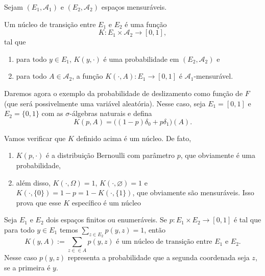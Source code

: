Sejam $(E_1, \mathcal{A}_1)$ e $(E_2, \mathcal{A}_2)$ espaços mensuráveis.
\begin{definition}
  Um núcleo de transição entre $E_1$ e $E_2$ é uma função 
  \begin{equation}
    K: E_1 \times \mathcal{A}_2 \to [0,1],
  \end{equation}
  tal que
  \begin{enumerate}[\quad a)]
  \item para todo $y \in E_1$, $K(y,\cdot)$ é uma probabilidade em $(E_2, \mathcal{A}_2)$ e
  \item para todo $A \in \mathcal{A}_2$, a função $K(\cdot, A): E_1 \to [0,1]$ é $\mathcal{A}_1$-mensurável.
  \end{enumerate}
\end{definition}

\begin{example}
  \label{x:chance_deslizamento}
  Daremos agora o exemplo da probabilidade de deslizamento como função de $F$ (que será possivelmente uma variável aleatória).
  Nesse caso, seja $E_1 = [0,1]$ e $E_2 = \{0,1\}$ com as $\sigma$-álgebras naturais e defina
  \begin{equation}
    K(p, A) = \big( (1-p)\delta_0 + p \delta_1 \big) (A).
  \end{equation}
\end{example}

Vamos verificar que $K$ definido acima é um núcleo.
De fato,
\begin{enumerate}[\quad i)]
\item $K(p, \cdot)$ é a distribuição Bernoulli com parâmetro $p$, que obviamente é uma probabilidade,
\item além disso, $K(\cdot, \Omega) = 1$, $K(\cdot, \varnothing) = 1$ e $K(\cdot, \{0\}) = 1-p = 1 - K(\cdot,\{1\})$, que obviamente são mensuráveis.
Isso prova que esse $K$ específico é um núcleo
\end{enumerate}

\begin{example}[Discreto]
  \label{x:nucleo_discreto}
  Seja $E_1$ e $E_2$ dois espaços finitos ou enumeráveis.
  Se $p: E_1 \times E_2 \to [0,1]$ é tal que para todo $y \in E_1$ temos $\sum_{z\in E_2} p(y, z) = 1$, então
  \begin{equation}
    K(y, A) := \sum_{z\in \in A} p(y, z) \text{ é um núcleo de transição entre $E_1$ e $E_2$.}
  \end{equation}
  Nesse caso $p(y,z)$ representa a probabilidade que a segunda coordenada seja $z$, se a primeira é $y$.
\end{example}

